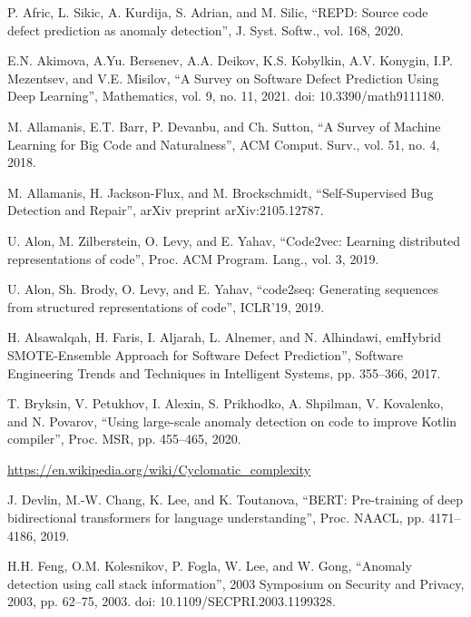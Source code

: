 \documentclass[10pt,conference]{IEEEtran}
\begin{document}


\begin{thebibliography}{00}

 P. Afric, L. Sikic, A. Kurdija, S. Adrian, and M. Silic,
 ``REPD: Source code defect prediction as anomaly detection'',
 J. Syst. Softw., vol. 168, 2020.

E.N. Akimova, A.Yu. Bersenev, A.A. Deikov, K.S. Kobylkin, A.V. Konygin, I.P. Mezentsev, and V.E. Misilov,
 ``A Survey on Software Defect Prediction Using Deep Learning'',
 Mathematics, vol. 9, no. 11, 2021.
doi: 10.3390/math9111180.

 M. Allamanis, E.T. Barr, P. Devanbu, and Ch. Sutton,
 ``A Survey of Machine Learning for Big Code and Naturalness'',
 ACM Comput. Surv., vol. 51, no. 4, 2018.

 M. Allamanis, H. Jackson-Flux, and M. Brockschmidt,
 ``Self-Supervised Bug Detection and Repair'',
 arXiv preprint arXiv:2105.12787.

 U. Alon, M. Zilberstein, O. Levy, and E. Yahav,
 ``Code2vec: Learning distributed representations of code'',
 Proc. ACM Program. Lang., vol. 3, 2019.

 U. Alon, Sh. Brody, O. Levy, and E. Yahav,
 ``code2seq: Generating sequences from structured representations of code'',
 ICLR'19, 2019.

 H. Alsawalqah, H. Faris, I. Aljarah, L. Alnemer, and N. Alhindawi,
 emHybrid SMOTE-Ensemble Approach for Software Defect Prediction'',
 Software Engineering Trends and Techniques in Intelligent Systems, pp. 355--366, 2017.

 T. Bryksin, V. Petukhov, I. Alexin, S. Prikhodko, A. Shpilman, V. Kovalenko, and  N. Povarov,
 ``Using large-scale anomaly detection on code to improve Kotlin compiler'',
 Proc. MSR, pp. 455--465, 2020.

 \url{https://en.wikipedia.org/wiki/Cyclomatic_complexity}

 J. Devlin, M.-W. Chang, K. Lee, and K. Toutanova,
 ``BERT: Pre-training of deep bidirectional transformers for language understanding'',
 Proc. NAACL, pp. 4171--4186, 2019.

H.H. Feng, O.M. Kolesnikov, P. Fogla, W. Lee, and W. Gong,
``Anomaly detection using call stack information'',
 2003 Symposium on Security and Privacy, 2003, pp. 62--75, 2003.
 doi: 10.1109/SECPRI.2003.1199328.


\end{thebibliography}
\end{document}
